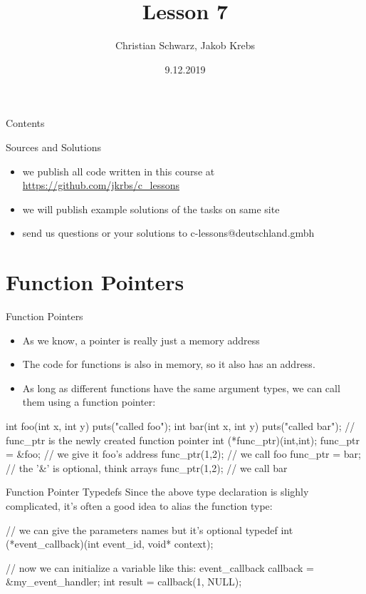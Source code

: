 \documentclass[10pt,graphics,aspectratio=169,table]{beamer}
\title{Lesson 7}
\author{Christian Schwarz, Jakob Krebs}
\date{9.12.2019}
\begin{document}
\maketitle

\begin{frame}{Contents}
    \tableofcontents
\end{frame}

\begin{frame}{Sources and Solutions}
    \begin{itemize}
        \item we publish all code written in this course at \url{https://github.com/jkrbs/c_lessons}
        \item we will publish example solutions of the tasks on same site
        \item send us questions or your solutions to c-lessons@deutschland.gmbh
    \end{itemize}
\end{frame}


\section{Function Pointers}
\begin{frame}[fragile]{Function Pointers}
    \begin{itemize}
        \item As we know, a pointer is really just a memory address
        \item The code for functions is also in memory, so it also has an address.
        \item As long as different functions have the same argument types, we
        can call them using a function pointer:
    \end{itemize}

    \begin{codeblock}
int foo(int x, int y){ puts("called foo"); }
int bar(int x, int y){ puts("called bar"); }
// func_ptr is the newly created function pointer 
int (*func_ptr)(int,int);
func_ptr = &foo; // we give it foo's address
func_ptr(1,2); // we call foo
func_ptr = bar; // the '&' is optional, think arrays
func_ptr(1,2); // we call bar
    \end{codeblock}

\end{frame}


\begin{frame}[fragile]{Function Pointer Typedefs}
    Since the above type declaration is slighly complicated,
    it's often a good idea to alias the function type:
    \begin{codeblock}
// we can give the parameters names but it's optional
typedef int (*event_callback)(int event_id, void* context);

// now we can initialize a variable like this:
event_callback callback = &my_event_handler;
int result = callback(1, NULL);
    \end{codeblock}

\end{frame}
\end{document}
